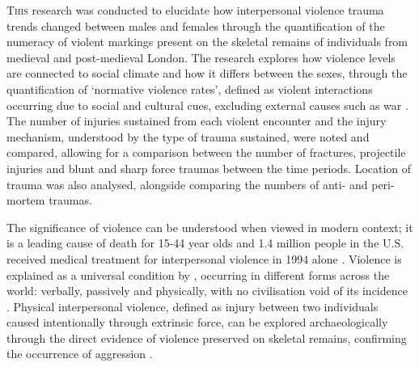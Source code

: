 

\lettrine{T}{his} research was conducted to elucidate how interpersonal violence trauma trends changed between males and females through the quantification of the numeracy of violent markings present on the skeletal remains of individuals from medieval and post-medieval London. The research explores how  violence levels are connected to social climate and how it differs between the sexes, through the quantification of ‘normative violence rates’, defined as violent interactions occurring due to social and cultural cues, excluding external causes such as war \parencites{brownstein2000}{meyerson2004}. The number of injuries sustained from each violent encounter and the injury mechanism, understood by the type of trauma sustained, were noted and compared, allowing for a comparison between the number of fractures, projectile injuries and blunt and sharp force traumas between the time periods. Location of trauma was also analysed, alongside comparing the numbers of anti- and peri-mortem traumas. 


The significance of violence can be understood when viewed in modern context; it is a leading cause of death for 15-44 year olds and 1.4 million people in the U.S. received medical treatment for interpersonal violence in 1994 alone \parencites{rand1997}{redfern2013}{worldhealthorganization2002}. Violence is explained as a universal condition by 
\textcite{mccall2008}, occurring in different forms across the world: verbally, passively and physically, with no civilisation void of its incidence 
\parencites{baker1992}{lovell1997}. Physical interpersonal violence, defined as injury between two individuals caused intentionally through extrinsic force, 
can be explored archaeologically through the direct evidence of violence preserved on skeletal remains, confirming the occurrence of aggression \parencites{lovell1997}{klein1999}{gardiner1999}{walker2001}. 

